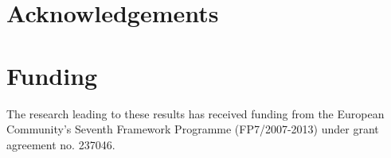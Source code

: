\documentclass{bioinfo}
\begin{document}
\section*{Acknowledgements}


\section*{Funding}

The research leading to these results has received funding from the European Community's 
Seventh Framework Programme (FP7/2007-2013) under grant agreement no. 237046.




\end{document}
